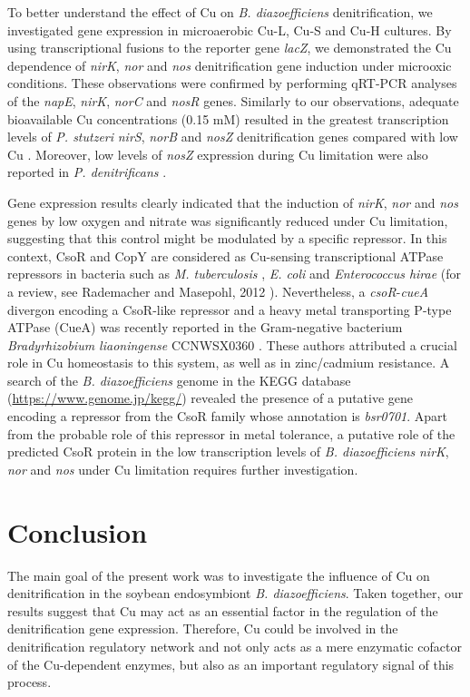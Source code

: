 \documentclass[a4paper,11pt]{article}
\begin{document}
To better understand the effect of Cu on {\em B. diazoefficiens} denitrification, we investigated
gene expression in microaerobic Cu-L, Cu-S and Cu-H cultures. By using transcriptional fusions to the reporter gene {\em lacZ}, we demonstrated the Cu dependence of {\em nirK}, {\em nor} and {\em nos} denitrification
gene induction under microoxic conditions. These observations were confirmed by
performing qRT-PCR analyses of the {\em napE}, {\em nirK}, {\em norC} and {\em nosR} genes. Similarly to our
observations, adequate bioavailable Cu concentrations (0.15 mM) resulted in the greatest
transcription levels of {\em P. stutzeri} {\em nirS}, {\em norB} and {\em nosZ} denitrification genes compared with
low Cu \cite{black2016influence}. Moreover, low levels of {\em nosZ} expression during Cu limitation were also
reported in {\em P. denitrificans} \cite{sullivan2013copper}.

Gene expression results clearly indicated that the induction of {\em nirK}, {\em nor} and {\em nos} genes
by low oxygen and nitrate was significantly reduced under Cu limitation, suggesting
that this control might be modulated by a specific repressor. In this context, CsoR and
CopY are considered as Cu-sensing transcriptional ATPase repressors in bacteria such
as {\em M. tuberculosis} \cite{liu2007csor}, {\em E. coli} and {\em Enterococcus hirae} (for a review, see Rademacher and
Masepohl, 2012 \cite{rademacher2012copper}). Nevertheless, a {\em csoR}-{\em cueA} divergon encoding a CsoR-like repressor
and a heavy metal transporting P-type ATPase (CueA) was recently reported in the
Gram-negative bacterium {\em Bradyrhizobium liaoningense} CCNWSX0360 \cite{liu2007csor}. These authors
attributed a crucial role in Cu homeostasis to this system, as well as in zinc/cadmium resistance.
A search of the {\em B. diazoefficiens} genome in the KEGG database (\url{https://www.genome.jp/kegg/}) revealed the presence of a putative gene encoding a
repressor from the CsoR family whose annotation is {\em bsr0701}. Apart from the probable role
of this repressor in metal tolerance, a putative role of the predicted CsoR protein in the
low transcription levels of {\em B. diazoefficiens} {\em nirK}, {\em nor} and {\em nos} under Cu limitation requires
further investigation.

\section{Conclusion}
The main goal of the present work was to investigate the influence of Cu on denitrification
in the soybean endosymbiont {\em B. diazoefficiens}. Taken together, our results suggest that
Cu may
act as an essential factor in the regulation of the denitrification gene expression. Therefore, Cu could be involved in the denitrification regulatory network and
not only acts as a mere enzymatic cofactor of the Cu-dependent enzymes, but also as an
important regulatory signal of this process.



\end{document}
